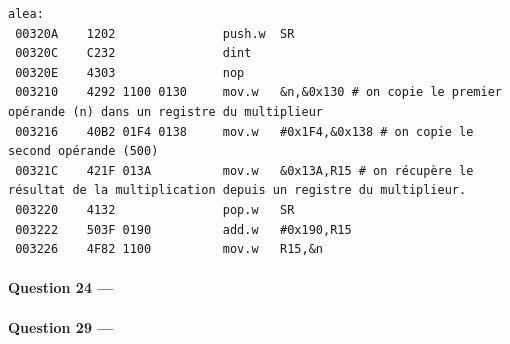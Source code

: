 \documentclass[a4paper,11pt,article]{memoir}
\begin{document}
\begin{verbatim}
alea:
 00320A    1202               push.w  SR
 00320C    C232               dint
 00320E    4303               nop
 003210    4292 1100 0130     mov.w   &n,&0x130 # on copie le premier opérande (n) dans un registre du multiplieur
 003216    40B2 01F4 0138     mov.w   #0x1F4,&0x138 # on copie le second opérande (500)
 00321C    421F 013A          mov.w   &0x13A,R15 # on récupère le résultat de la multiplication depuis un registre du multiplieur.
 003220    4132               pop.w   SR
 003222    503F 0190          add.w   #0x190,R15
 003226    4F82 1100          mov.w   R15,&n
\end{verbatim}

\paragraph{Question 24 ---}

\paragraph{Question 29 ---}
\end{document}
